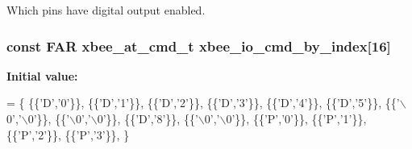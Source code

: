 Which pins have digital output enabled. 

\hypertarget{group__xbee__io_gae37c4ac030a185af04ce61671b8acfbd}{
\subsubsection[{xbee\-\_\-io\-\_\-cmd\-\_\-by\-\_\-index}]{\setlength{\rightskip}{0pt plus 5cm}const {\bf F\-A\-R} {\bf xbee\-\_\-at\-\_\-cmd\-\_\-t} xbee\-\_\-io\-\_\-cmd\-\_\-by\-\_\-index\mbox{[}16\mbox{]}}}\label{group__xbee__io_gae37c4ac030a185af04ce61671b8acfbd}
{\bfseries Initial value\-:}
\begin{DoxyCode}
=
\{
   \{\{\textcolor{charliteral}{'D'},\textcolor{charliteral}{'0'}\}\},
   \{\{\textcolor{charliteral}{'D'},\textcolor{charliteral}{'1'}\}\},
   \{\{\textcolor{charliteral}{'D'},\textcolor{charliteral}{'2'}\}\},
   \{\{\textcolor{charliteral}{'D'},\textcolor{charliteral}{'3'}\}\},
   \{\{\textcolor{charliteral}{'D'},\textcolor{charliteral}{'4'}\}\},
   \{\{\textcolor{charliteral}{'D'},\textcolor{charliteral}{'5'}\}\},
   \{\{\textcolor{charliteral}{'\(\backslash\)0'},\textcolor{charliteral}{'\(\backslash\)0'}\}\},
   \{\{\textcolor{charliteral}{'\(\backslash\)0'},\textcolor{charliteral}{'\(\backslash\)0'}\}\},
   \{\{\textcolor{charliteral}{'D'},\textcolor{charliteral}{'8'}\}\},
   \{\{\textcolor{charliteral}{'\(\backslash\)0'},\textcolor{charliteral}{'\(\backslash\)0'}\}\},
   \{\{\textcolor{charliteral}{'P'},\textcolor{charliteral}{'0'}\}\},
   \{\{\textcolor{charliteral}{'P'},\textcolor{charliteral}{'1'}\}\},
   \{\{\textcolor{charliteral}{'P'},\textcolor{charliteral}{'2'}\}\},
   \{\{\textcolor{charliteral}{'P'},\textcolor{charliteral}{'3'}\}\},
\}
\end{DoxyCode}
